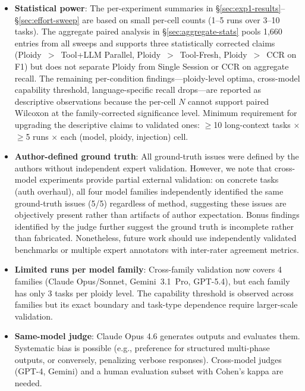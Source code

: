 \documentclass[11pt]{article}
\begin{document}
\begin{itemize}[leftmargin=1.5em]
  \item \textbf{Statistical power}: The per-experiment summaries in \S\ref{sec:exp1-results}--\S\ref{sec:effort-sweep} are based on small per-cell counts (1--5 runs over 3--10 tasks). The aggregate paired analysis in \S\ref{sec:aggregate-stats} pools 1{,}660 entries from all sweeps and supports three statistically corrected claims (Ploidy~$>$~Tool+LLM Parallel, Ploidy~$>$~Tool-Fresh, Ploidy~$>$~CCR on F1) but does not separate Ploidy from Single Session or CCR on aggregate recall. The remaining per-condition findings---ploidy-level optima, cross-model capability threshold, language-specific recall drops---are reported as descriptive observations because the per-cell $N$ cannot support paired Wilcoxon at the family-corrected significance level. Minimum requirement for upgrading the descriptive claims to validated ones: $\geq$10 long-context tasks $\times$ $\geq$5 runs $\times$ each (model, ploidy, injection) cell.
  \item \textbf{Author-defined ground truth}: All ground-truth issues were defined by the authors without independent expert validation. However, we note that cross-model experiments provide partial external validation: on concrete tasks (auth overhaul), all four model families independently identified the same ground-truth issues (5/5) regardless of method, suggesting these issues are objectively present rather than artifacts of author expectation. Bonus findings identified by the judge further suggest the ground truth is incomplete rather than fabricated. Nonetheless, future work should use independently validated benchmarks or multiple expert annotators with inter-rater agreement metrics.
  \item \textbf{Limited runs per model family}: Cross-family validation now covers 4 families (Claude Opus/Sonnet, Gemini~3.1~Pro, GPT-5.4), but each family has only 3 tasks per ploidy level. The capability threshold is observed across families but its exact boundary and task-type dependence require larger-scale validation.
  \item \textbf{Same-model judge}: Claude Opus 4.6 generates outputs and evaluates them. Systematic bias is possible (e.g., preference for structured multi-phase outputs, or conversely, penalizing verbose responses). Cross-model judges (GPT-4, Gemini) and a human evaluation subset with Cohen's kappa are needed.

\end{itemize}
\end{document}
